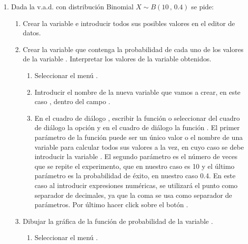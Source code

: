 \begin{enumerate}[leftmargin=*]
\item Dada la v.a.d. con distribución Binomial $X\sim B(10\,,\,0.4)$ se 
pide:

\begin{enumerate}
\item Crear la variable  e introducir todos sus posibles
valores en el editor de datos.

\item  Crear la variable  que contenga la
probabilidad de cada uno de los valores de la variable .
Interpretar los valores de la variable obtenidos.

\begin{indicacion}
\begin{enumerate}
\item Seleccionar el menú .

\item Introducir el nombre de la nueva variable que vamos a crear, en este caso , dentro del
campo .

\item En el cuadro de diálogo ,
escribir la función  o seleccionar del cuadro 
de diálogo  la opción  y en el 
cuadro de diálogo  la 
función . El primer parámetro de la función 
 puede ser
un único valor o el nombre de una variable para calcular todos sus
valores a la vez, en cuyo caso se debe introducir la variable .
El segundo parámetro es el número de veces que se repite el
experimento, que en nuestro caso es 10 y el último parámetro es la
probabilidad de éxito, en nuestro caso 0.4. En este caso al
introducir expresiones numéricas, se utilizará el punto como
separador de decimales, ya que la coma se usa como separador de
parámetros. Por último hacer click sobre el botón
.

\end{enumerate}
\end{indicacion}

\item Dibujar la gráfica de la función de probabilidad de la
variable .

\begin{indicacion}
\begin{enumerate}
\item Seleccionar el menú .


\end{enumerate}
\end{indicacion}
\end{enumerate}
\end{enumerate}
